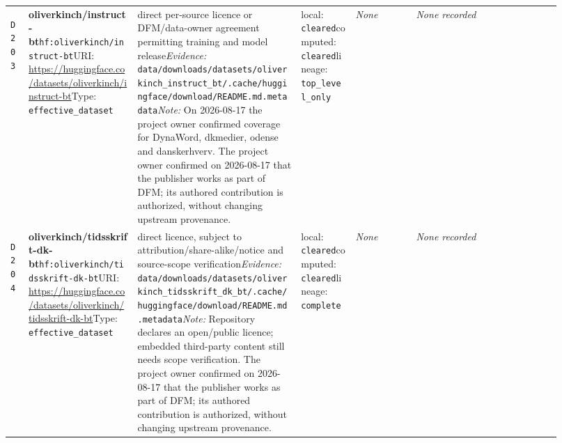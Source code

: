 \documentclass[9pt,a4paper]{article}
\newcommand{\depid}[1]{\hypertarget{dep:#1}{\texttt{#1}}}
\begin{document}
\begin{landscape}
\begin{longtable}{@{}L{0.035\linewidth}L{0.185\linewidth}L{0.27\linewidth}L{0.09\linewidth}L{0.10\linewidth}L{0.24\linewidth}@{}}
\depid{D203} & \textbf{oliverkinch/instruct-bt}\newline \nolinkurl{hf:oliverkinch/instruct-bt}\newline URI: \url{https://huggingface.co/datasets/oliverkinch/instruct-bt}\newline Type: \texttt{effective\_dataset} & direct per-source licence or DFM/data-owner agreement permitting training and model release\newline \textit{Evidence:} \nolinkurl{data/downloads/datasets/oliverkinch_instruct_bt/.cache/huggingface/download/README.md.metadata}\newline \textit{Note:} On 2026-08-17 the project owner confirmed coverage for DynaWord, dkmedier, odense and danskerhverv. The project owner confirmed on 2026-08-17 that the publisher works as part of DFM; its authored contribution is authorized, without changing upstream provenance. & local: \texttt{cleared}\newline computed: \texttt{cleared}\newline lineage: \texttt{top\_level\_only} & \textit{None} & \textit{None recorded} \\
\depid{D204} & \textbf{oliverkinch/tidsskrift-dk-bt}\newline \nolinkurl{hf:oliverkinch/tidsskrift-dk-bt}\newline URI: \url{https://huggingface.co/datasets/oliverkinch/tidsskrift-dk-bt}\newline Type: \texttt{effective\_dataset} & direct licence, subject to attribution/share-alike/notice and source-scope verification\newline \textit{Evidence:} \nolinkurl{data/downloads/datasets/oliverkinch_tidsskrift_dk_bt/.cache/huggingface/download/README.md.metadata}\newline \textit{Note:} Repository declares an open/public licence; embedded third-party content still needs scope verification. The project owner confirmed on 2026-08-17 that the publisher works as part of DFM; its authored contribution is authorized, without changing upstream provenance. & local: \texttt{cleared}\newline computed: \texttt{cleared}\newline lineage: \texttt{complete} & \textit{None} & \textit{None recorded} \\

\end{longtable}
\end{landscape}
\end{document}
